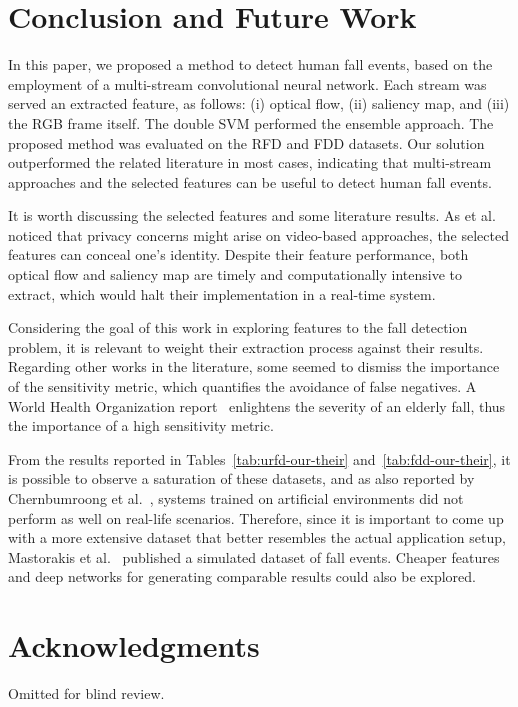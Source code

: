 \documentclass[conference]{IEEEtran}
\begin{document}
\section{Conclusion and Future Work}
\label{sec:conclusion}

In this paper, we proposed a method to detect human fall events, based on the employment of a multi-stream convolutional neural network. Each stream was served an extracted feature, as follows: (i) optical flow, (ii) saliency map, and (iii) the RGB frame itself. The double SVM performed the ensemble approach. The proposed method was evaluated on the RFD and FDD datasets. Our solution outperformed the related literature in most cases, indicating that multi-stream approaches and the selected features can be useful to detect human fall events.

It is worth discussing the selected features and some literature results. As et al.~\cite{chernbumroong2012elderly} noticed that privacy concerns might arise on video-based approaches, the selected features can conceal one's identity. Despite their feature performance, both optical flow and saliency map are timely and computationally intensive to extract, which would halt their implementation in a real-time system.

Considering the goal of this work in exploring features to the fall detection problem, it is relevant to weight their extraction process against their results. Regarding other works in the literature, some seemed to dismiss the importance of the sensitivity metric, which quantifies the avoidance of false negatives. A World Health Organization report~\cite{who2007report} enlightens the severity of an elderly fall, thus the importance of a high sensitivity metric.

From the results reported in Tables~\ref{tab:urfd-our-their} and~\ref{tab:fdd-our-their}, it is possible to observe a saturation of these datasets, and as also reported by Chernbumroong et al.~\cite{chernbumroong2012elderly}, systems trained on artificial environments did not perform as well on real-life scenarios. Therefore, since it is important to come up with a more extensive dataset that better resembles the actual application setup, Mastorakis et al.~\cite{mastorakis2018fall} published a simulated dataset of fall events. Cheaper features and deep networks for generating comparable results could also be explored.

\section*{Acknowledgments}

Omitted for blind review.



\end{document}
